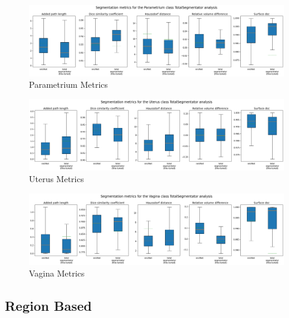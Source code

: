 \documentclass[11pt,twoside]{report}
\begin{document}
\begin{landscape}
  \begin{figure}[H]
    \centering
    \includegraphics[width=\linewidth]{../../research/source/code/data/metrics/metricsparametrium_1_combinednotable_TotalSegmentator_analysis.png}
    \caption{Parametrium Metrics}\label{fig:totalsegmentator-metrics-parametrium}
  \end{figure}

  \begin{figure}[H]
    \centering
    \includegraphics[width=\linewidth]{../../research/source/code/data/metrics/metricsuterus_1_combinednotable_TotalSegmentator_analysis.png}
    \caption{Uterus Metrics}\label{fig:totalsegmentator-metrics-uterus}
  \end{figure}

  \begin{figure}[H]
    \centering
    \includegraphics[width=\linewidth]{../../research/source/code/data/metrics/metricsvagina_1_combinednotable_TotalSegmentator_analysis.png}
    \caption{Vagina Metrics}\label{fig:totalsegmentator-metrics-vagina}
  \end{figure}

\end{landscape}

\subsection{Region Based}\label{sect:region-based-appendix}
\end{document}
